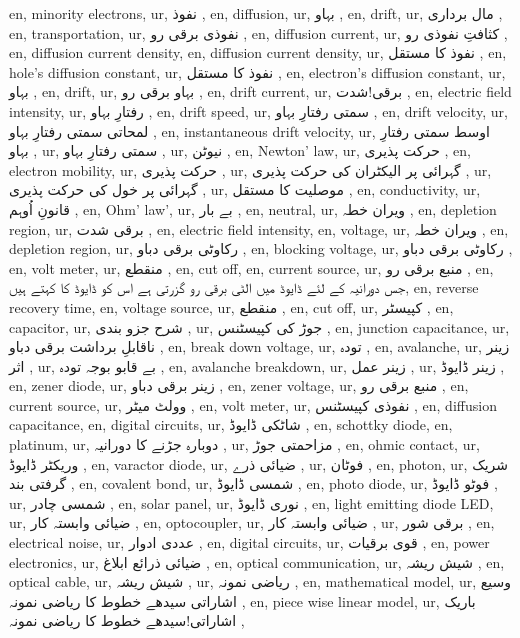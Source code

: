 en, minority electrons,
ur, نفوذ ,
en, diffusion,
ur, بہاو ,
en, drift,
ur, مال برداری ,
en, transportation,
ur, نفوذی برقی رو ,
en, diffusion current,
ur, کثافتِ نفوذی رو ,
en, diffusion current density,
en, diffusion current density,
ur, نفوذ کا مستقل ,
en, hole's diffusion constant,
ur, نفوذ کا مستقل ,
en, electron's diffusion constant,
ur, بہاو ,
en, drift,
ur, بہاو برقی رو ,
en, drift current,
ur, برقی!شدت ,
en, electric field intensity,
ur, رفتارِ بہاو ,
en, drift speed,
ur, سمتی رفتارِ بہاو ,
en, drift velocity,
ur, لمحاتی سمتی رفتارِ بہاو ,
en, instantaneous drift velocity,
ur, اوسط سمتی رفتارِ بہاو ,
ur, سمتی رفتارِ بہاو ,
ur, نیوٹن ,
en, Newton' law,
ur, حرکت پذیری ,
en, electron mobility,
ur, حرکت پذیری ,
ur, گہرائی پر الیکٹران کی حرکت پذیری ,
ur, گہرائی پر خول کی حرکت پذیری ,
ur, موصلیت کا مستقل ,
en, conductivity,
ur, قانونِ اُوہم ,
en, Ohm' law',
ur, بے بار ,
en, neutral,
ur, ویران خطہ ,
en, depletion region,
ur, برقی شدت ,
en, electric field intensity,
en, voltage,
ur, ویران خطہ ,
en, depletion region,
ur, رکاوٹی برقی دباو ,
en, blocking voltage,
ur, رکاوٹی برقی دباو ,
en, volt meter,
ur, منقطع ,
en, cut off,
en, current source,
ur, منبع برقی رو ,
en, جس دورانیہ کے لئے ڈایوڈ میں الٹی برقی رو گزرتی ہے اس کو ڈایوڈ کا  کہتے ہیں,
en, reverse recovery time,
en, voltage source,
ur, منقطع ,
en, cut off,
ur, کپیسٹر ,
en, capacitor,
ur, شرح جزو بندی ,
ur, جوڑ کی کپیسٹنس ,
en, junction capacitance,
ur, ناقابلِ برداشت برقی دباو ,
en, break down voltage,
ur, تودہ ,
en, avalanche,
ur, زینر اثر ,
ur, بے قابو بوجہ تودہ ,
en, avalanche breakdown,
ur, زینر عمل ,
ur, زینر ڈایوڈ ,
en, zener diode,
ur, زینر برقی دباو ,
en, zener voltage,
ur, منبع برقی رو ,
en, current source,
ur, وولٹ میٹر ,
en, volt meter,
ur, نفوذی کپیسٹنس ,
en, diffusion capacitance,
en, digital circuits,
ur, شاٹکی ڈایوڈ ,
en, schottky diode,
en, platinum,
ur, دوبارہ جڑنے کا دورانیہ ,
ur, مزاحمتی جوڑ ,
en, ohmic contact,
ur, وریکٹر ڈایوڈ ,
en, varactor diode,
ur, ضیائی ذرے ,
ur, فوٹان ,
en, photon,
ur, شریک گرفتی بند ,
en, covalent bond,
ur, شمسی ڈایوڈ ,
en, photo diode,
ur, فوٹو ڈایوڈ ,
ur, شمسی چادر ,
en, solar panel,
ur, نوری ڈایوڈ ,
en, light emitting diode LED,
ur, ضیائی وابستہ کار ,
en, optocoupler,
ur, ضیائی وابستہ کار ,
ur, برقی شور ,
en, electrical noise,
ur, عددی ادوار ,
en, digital circuits,
ur, قوی برقیات ,
en, power electronics,
ur, ضیائی ذرائع ابلاغ ,
en, optical communication,
ur, شیش ریشہ ,
en, optical cable,
ur, شیش ریشہ ,
ur, ریاضی نمونہ ,
en, mathematical model,
ur, وسیع اشاراتی سیدھے خطوط کا ریاضی نمونہ ,
en, piece wise linear model,
ur, باریک اشاراتی!سیدھے خطوط کا ریاضی نمونہ ,
